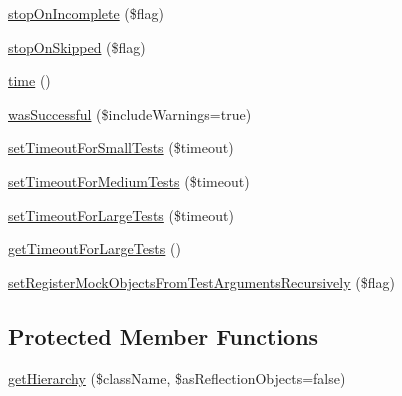 \begin{DoxyCompactItemize}
\item 
\mbox{\hyperlink{class_p_h_p_unit___framework___test_result_a0c93edd1d359d8261cb066e9f6d96789}{stop\+On\+Incomplete}} (\$flag)
\item 
\mbox{\hyperlink{class_p_h_p_unit___framework___test_result_a99662fe5571720db62a3fc7f5cd418b6}{stop\+On\+Skipped}} (\$flag)
\item 
\mbox{\hyperlink{class_p_h_p_unit___framework___test_result_ad0150b710cab9ab24923212cbf226447}{time}} ()
\item 
\mbox{\hyperlink{class_p_h_p_unit___framework___test_result_a01bbecf98dd9cb81e38294f47a5e0d7d}{was\+Successful}} (\$include\+Warnings=true)
\item 
\mbox{\hyperlink{class_p_h_p_unit___framework___test_result_aec18872b6dcd69cd9baca6667cba392b}{set\+Timeout\+For\+Small\+Tests}} (\$timeout)
\item 
\mbox{\hyperlink{class_p_h_p_unit___framework___test_result_a0ac8e818190abb2935540292676aa786}{set\+Timeout\+For\+Medium\+Tests}} (\$timeout)
\item 
\mbox{\hyperlink{class_p_h_p_unit___framework___test_result_aceb63e511d84cd7bd597bfa5f65da8dc}{set\+Timeout\+For\+Large\+Tests}} (\$timeout)
\item 
\mbox{\hyperlink{class_p_h_p_unit___framework___test_result_a12b4bb0aa9f5382fe0b9c1bce694469e}{get\+Timeout\+For\+Large\+Tests}} ()
\item 
\mbox{\hyperlink{class_p_h_p_unit___framework___test_result_afc571c4a180438ad4cd88f4031b48463}{set\+Register\+Mock\+Objects\+From\+Test\+Arguments\+Recursively}} (\$flag)
\end{DoxyCompactItemize}
\subsection*{Protected Member Functions}
\begin{DoxyCompactItemize}
\item 
\mbox{\hyperlink{class_p_h_p_unit___framework___test_result_a952eb5c0b661084cb12bb486af025f9d}{get\+Hierarchy}} (\$class\+Name, \$as\+Reflection\+Objects=false)
\end{DoxyCompactItemize}
